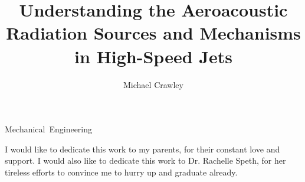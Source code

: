 \documentclass[english,11pt]{osudissert96}
\begin{document}
\author{Michael Crawley}
\title{Understanding the Aeroacoustic Radiation Sources and Mechanisms in High-Speed Jets}
\unit{Mechanical Engineering}


\maketitle
\disscopyright

\begin{abstract}
  
\end{abstract}

\begin{dedications}
I would like to dedicate this work to my parents, for their constant love and support. 
I would also like to dedicate this work to Dr. Rachelle Speth, for her tireless efforts to convince me to hurry up and graduate already. 
\end{dedications}



\tableofcontents
\listoffigures
       

  




\clearpage  {} {}\clearpage 


\end{document}
